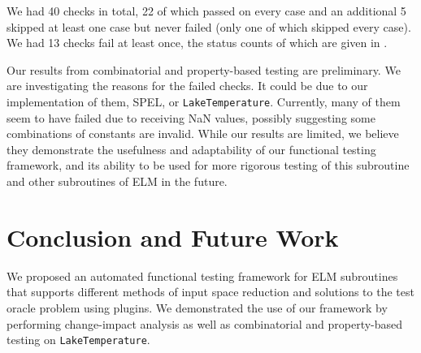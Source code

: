 \documentclass[10pt,twocolumn]{article}
\begin{document}
We had 40 checks in total, 22 of which passed on every case and an additional 5 skipped 
at least one case but never failed (only one of which skipped every case). We had 13 checks
fail at least once, the status counts of which are given in .

\begin{table}[tb]
    \centering
    \caption{Status counts for each check, per test suite (passed/skipped/failed)}
    \label{tab:check_statuses}
    \footnotesize
    
\end{table}


%

Our results from combinatorial and property-based testing are preliminary. 
We are investigating the reasons for the failed checks. It could be due to  
our implementation of them, SPEL, or \verb|LakeTemperature|. Currently, many of them seem to have failed due to receiving NaN values, possibly
suggesting some combinations of constants are invalid. While our results are limited, we 
believe they demonstrate the usefulness and adaptability of our functional testing 
framework, and its ability to be used for more rigorous testing of this subroutine and other
subroutines of ELM in the future.

\section{Conclusion and Future Work}
\label{sec:conclusion}

We proposed an automated functional testing framework for ELM subroutines that supports 
different methods of input space reduction and solutions to the test oracle problem using
plugins. We demonstrated the use of our framework by performing change-impact analysis as 
well as combinatorial and property-based testing on \verb|LakeTemperature|.
\end{document}
